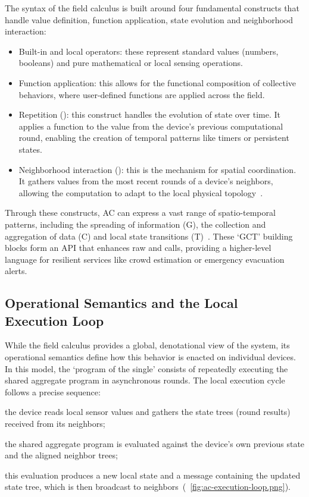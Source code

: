 The syntax of the field calculus is built around four fundamental constructs that handle value definition, function application, state evolution and neighborhood interaction:
\begin{itemize}
	\item Built-in and local operators: these represent standard values (numbers, booleans) and pure mathematical or local sensing operations.
	\item Function application: this allows for the functional composition of collective behaviors, where user-defined functions are applied across the field.
	\item Repetition (): this construct handles the evolution of state over time. It applies a function to the value from the device's previous computational round, enabling the creation of temporal patterns like timers or persistent states.
	\item Neighborhood interaction (): this is the mechanism for spatial coordination. It gathers values from the most recent rounds of a device's neighbors, allowing the computation to adapt to the local physical topology~\cite{DBLP:journals/tocl/AudritoVDPB19}.
\end{itemize}

Through these constructs, \ac{AC} can express a vast range of spatio-temporal patterns, including the spreading of information (G), the collection and aggregation of data (C) and local state transitions (T)~\cite{DBLP:journals/tomacs/ViroliABDP18}. These `GCT' building blocks form an \ac{API} that enhances raw  and  calls, providing a higher-level language for resilient services like crowd estimation or emergency evacuation alerts.

\subsection{Operational Semantics and the Local Execution Loop}

While the field calculus provides a global, denotational view of the system, its operational semantics define how this behavior is enacted on individual devices. In this model, the `program of the single' consists of repeatedly executing the shared aggregate program in asynchronous rounds. The local execution cycle follows a precise sequence:
\begin{inlinelist}
	\item the device reads local sensor values and gathers the state trees (round results) received from its neighbors;
	\item the shared aggregate program is evaluated against the device's own previous state and the aligned neighbor trees;
  \item this evaluation produces a new local state and a message containing the updated state tree, which is then broadcast to neighbors~\cite{DBLP:journals/jlap/ViroliBDACP19}(~\cref{fig:ac-execution-loop.png}).
\end{inlinelist}

